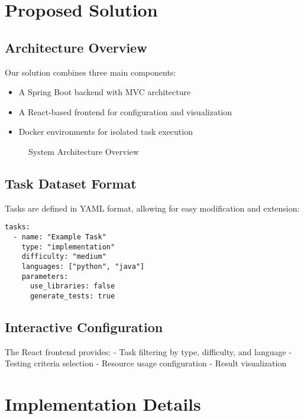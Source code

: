 \chapter{Proposed Solution}

\section{Architecture Overview}

Our solution combines three main components:
\begin{itemize}
    \item A Spring Boot backend with MVC architecture
    \item A React-based frontend for configuration and visualization
    \item Docker environments for isolated task execution
\end{itemize}

\begin{figure}[h]
    \centering
    \caption{System Architecture Overview}
    \label{fig:architecture}
\end{figure}

\section{Task Dataset Format}

Tasks are defined in YAML format, allowing for easy modification and extension:

\begin{verbatim}
tasks:
  - name: "Example Task"
    type: "implementation"
    difficulty: "medium"
    languages: ["python", "java"]
    parameters:
      use_libraries: false
      generate_tests: true
\end{verbatim}

\section{Interactive Configuration}

The React frontend provides:
- Task filtering by type, difficulty, and language
- Testing criteria selection
- Resource usage configuration
- Result visualization

\chapter{Implementation Details}

